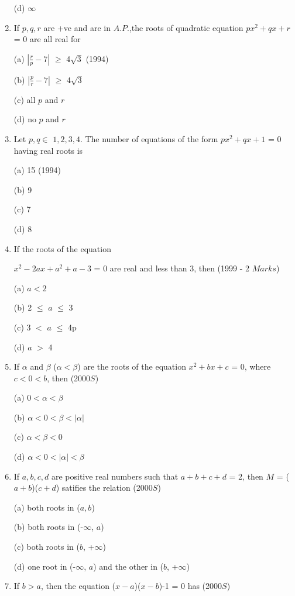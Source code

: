 \documentclass[journal,12pt,twocolumn]{IEEEtran}
\theoremstyle{remark}
\begin{document}
\begin{enumerate}
(d) $\infty$

 \item If $p,q,r$ are +ve and are in $A.P$.,the roots of quadratic equation $px^2+qx+r$ = 0 are all real for

(a) $\left|\frac{r}{p}-7\right|$ $\geq$ 4$\sqrt{3}$ \hfill (1994)

(b) $\left|\frac{p}{r}-7\right|$ $\geq$ 4$\sqrt{3}$

(c) all $p$ and $r$

(d) no $p$ and $r$

 \item Let $p,q \in$  ${1, 2, 3, 4}$. The number of equations of the form $px^2+qx+1$ = 0 having real roots is

(a) 15 \hfill (1994)

(b) 9

(c) 7

(d) 8

 \item If the roots of the equation 

$x^2-2ax+a^2+a-3$ = 0 are real and less than 3, then \hfill (1999 - 2 $Marks$)

(a) $a<2$

(b) 2 $\leq$ $a$ $\leq$ 3

(c) 3 $<$ $a$ $\leq$ 4p

(d) $a$ $>$ 4

 \item If $\alpha$ and $\beta$ ($\alpha < \beta$) are the roots of the equation $x^2+bx+c$ = 0, where $c < 0 < b$, then \hfill (2000$S$)

(a) $0 < \alpha < \beta$ 

(b) $\alpha < 0 < \beta < |\alpha|$

(c) $\alpha < \beta <0$

(d) $\alpha < 0 < |\alpha| < \beta$

 \item If $a, b, c, d$ are positive real numbers such that $a+b+c+d$ = 2, then $M$ = ($a+b$)($c+d$) satifies the relation \hfill (2000$S$)

(a) both roots in ($a,b$)

(b) both roots in (-$\infty$, $a$)

(c) both roots in ($b$, +$\infty$)

(d) one root in (-$\infty$, $a$) and the other in ($b$, +$\infty$)

 \item If $b > a$, then the equation ($x-a$)($x-b$)-1 = 0 has \hfill (2000$S$)


\end{enumerate}
\end{document}
